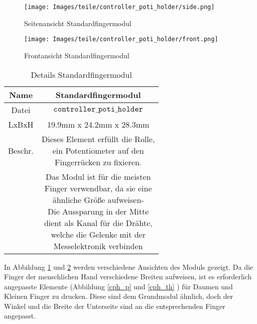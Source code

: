 \begin{minipage}{0.5\textwidth}
    \begin{figure}[H]
        \texttt{[image: Images/teile/controller\_poti\_holder/side.png]}
        \centering
        \caption{Seitenansicht Standardfingermodul}
        \label{cph_side}
    \end{figure}
    
\end{minipage}
\begin{minipage}{0.5\textwidth}
    \begin{figure}[H]
        \texttt{[image: Images/teile/controller\_poti\_holder/front.png]}
        \centering
        \caption{Frontansicht Standardfingermodul}
        \label{cph_front}
    \end{figure}
\end{minipage}

\begin{minipage}{0.6\textwidth}
    \begin{table}[H]
        \centering
        \begin{tabular}{|c|c|}
            \hline
            Name&Standardfingermodul\\
            \hline            
            Datei&$\texttt{controller}\_ \texttt{poti}\_ \texttt{holder}$\\
            \hline
            LxBxH&19.9mm x 24.2mm x 28.3mm\\
            \hline
            Beschr.&\shortstack{Dieses Element erfüllt die Rolle,\\ein Potentiometer auf den\\Fingerrücken zu fixieren.}\\
            &\shortstack{Das Modul ist für die meisten\\Finger verwendbar, da sie eine\\ähnliche Größe aufweisen-\\Die Aussparung in der Mitte\\dient als Kanal für die Drähte,\\welche die Gelenke mit der\\Messelektronik verbinden}\\
            \hline
        \end{tabular}
        \caption{Details Standardfingermodul}
        
    \end{table}
    
\end{minipage}
\begin{minipage}{0.4\textwidth}
    In Abbildung \ref{cph_side} und \ref{cph_front} werden verschiedene Ansichten des Moduls gezeigt. 
    Da die Finger der menschlichen Hand verschiedene Breiten aufweisen, ist es erforderlich angepasste Elemente (Abbildung \ref{cph_p} und \ref{cph_th} ) für 
    Daumen und Kleinen Finger zu drucken. Diese sind dem Grundmodul ähnlich, doch der Winkel und die Breite der Unterseite sind an die entsprechenden Finger angepasst. 
\end{minipage}


